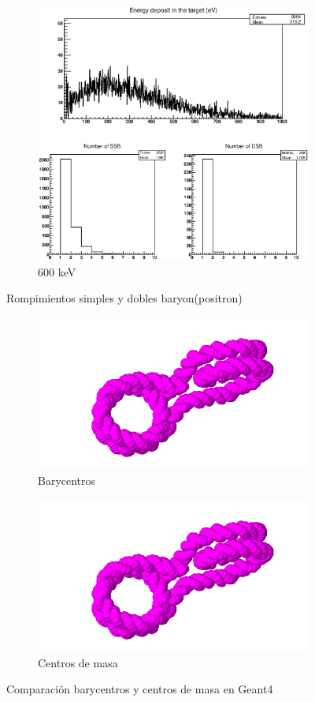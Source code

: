 \begin{figure}
\begin{subfigure}{.5\textwidth}
  \includegraphics[width=.78\linewidth]{./Figures/proton600kev.eps}
  \caption{600 keV}
  \label{fig:sub8}
\end{subfigure}
\caption[Rompimientos simples y dobles electrón(positron)]{Rompimientos simples y dobles baryon(positron)}
\label{fig:p}
\end{figure}

\begin{figure}
\centering
\begin{subfigure}{.5\textwidth}
  \centering
  \includegraphics[width=.78\linewidth]{./Figures/a.png}
  \caption{Barycentros}
  \label{fig:su1}
\end{subfigure}%
\begin{subfigure}{.5\textwidth}
  \centering
  \includegraphics[width=.78\linewidth]{./Figures/a.png}
  \caption{Centros de masa}
  \label{fig:su2}
\end{subfigure}
\caption{Comparación barycentros y centros de masa en Geant4}
\label{fig:test3}
\end{figure}


